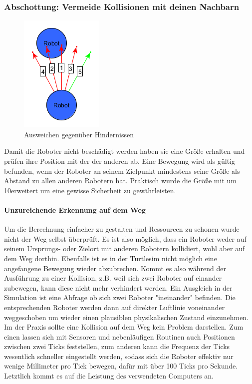 \subsubsection*{Abschottung: Vermeide Kollisionen mit deinen Nachbarn}

\begin{figure}
	\includegraphics[width=\pictureWidth,keepaspectratio]{graphics/AusweichenAlgorithmus.png}
	\caption{Ausweichen gegenüber Hindernissen}
	\label{pic:AusweichenAlgorithmus}
\end{figure}

Damit die Roboter nicht beschädigt werden haben sie eine Größe erhalten und prüfen ihre Position mit der der anderen ab. Eine Bewegung wird als gültig befunden, wenn der Roboter an seinem Zielpunkt mindestens seine Größe als Abstand zu allen anderen Robotern hat. Praktisch wurde die Größe mit um 10\per erweitert um eine gewisse Sicherheit zu gewährleisten.

\paragraph*{Unzureichende Erkennung auf dem Weg}
Um die Berechnung einfacher zu gestalten und Ressourcen zu schonen wurde nicht der Weg selbst überprüft. Es ist also möglich, dass ein Roboter weder auf seinem Ursprungs- oder Zielort mit anderen Robotern kollidiert, wohl aber auf dem Weg dorthin. Ebenfalls ist es in der Turtlesim nicht möglich eine angefangene Bewegung wieder abzubrechen. Kommt es also während der Ausführung zu einer Kollision, z.B. weil sich zwei Roboter auf einander zubewegen, kann diese nicht mehr verhindert werden. Ein Ausgleich in der Simulation ist eine Abfrage ob sich zwei Roboter "ineinander" befinden. Die entsprechenden Roboter werden dann auf direkter Luftlinie voneinander weggeschoben um wieder einen plausiblen physikalischen Zustand einzunehmen.
Im der Praxis sollte eine Kollision auf dem Weg kein Problem darstellen. Zum einen lassen sich mit Sensoren und nebenläufigen Routinen auch Positionen zwischen zwei Ticks feststellen, zum anderen kann die Frequenz der Ticks wesentlich schneller eingestellt werden, sodass sich die Roboter effektiv nur wenige Millimeter pro Tick bewegen, dafür mit über 100 Ticks pro Sekunde. Letztlich kommt es auf die Leistung des verwendeten Computers an.


